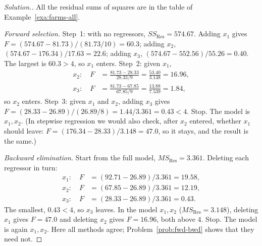 \documentclass[11pt,a4paper]{article}
\numberwithin{equation}{section}
\theoremstyle{definition}
\newenvironment{solution}
  {\renewcommand{\qedsymbol}{}\begin{proof}[\textit{Solution}.]}
  {\end{proof}}
\begin{document}
\begin{solution}
All the residual sums of squares are in the table of Example~\ref{exa:farms-all}.

\emph{Forward selection.} Step~1: with no regressors, $SS_{\mathrm{Res}} = 574.67$. Adding $x_1$ gives
$F = (574.67 - 81.73)/(81.73/10) = 60.3$; adding $x_2$, $(574.67 - 176.34)/17.63 = 22.6$; adding $x_3$,
$(574.67 - 552.56)/55.26 = 0.40$. The largest is $60.3 > 4$, so $x_1$ enters.
Step~2: given $x_1$,
\begin{align*}
x_2:\quad F &= \frac{81.73 - 28.33}{28.33/9} = \frac{53.40}{3.148} = 16.96, \\
x_3:\quad F &= \frac{81.73 - 67.85}{67.85/9} = \frac{13.88}{7.539} = 1.84 ,
\end{align*}
so $x_2$ enters. Step~3: given $x_1$ and $x_2$, adding $x_3$ gives
$F = (28.33 - 26.89)/(26.89/8) = 1.44/3.361 = 0.43 < 4$. Stop. The model is $x_1, x_2$.
(In stepwise regression we would also check, after $x_2$ entered, whether $x_1$ should leave:
$F = (176.34 - 28.33)/3.148 = 47.0$, so it stays, and the result is the same.)

\emph{Backward elimination.} Start from the full model, $MS_{\mathrm{Res}} = 3.361$. Deleting each
regressor in turn:
\begin{align*}
x_1:\quad F &= (92.71 - 26.89)/3.361 = 19.58, \\
x_2:\quad F &= (67.85 - 26.89)/3.361 = 12.19, \\
x_3:\quad F &= (28.33 - 26.89)/3.361 = 0.43 .
\end{align*}
The smallest, $0.43 < 4$, so $x_3$ leaves. In the model $x_1, x_2$ ($MS_{\mathrm{Res}} = 3.148$), deleting $x_1$
gives $F = 47.0$ and deleting $x_2$ gives $F = 16.96$, both above $4$. Stop. The model is again $x_1, x_2$.
Here all methods agree; Problem~\ref{prob:fwd-bwd} shows that they need not.
\end{solution}
\end{document}
